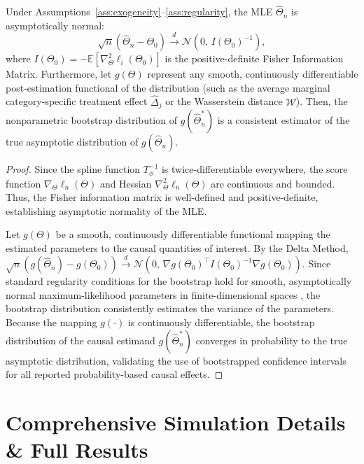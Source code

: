 \documentclass{article}
\numberwithin{figure}{section}
\numberwithin{table}{section}
\numberwithin{equation}{section}
\begin{document}
\begin{theorem}
Under Assumptions~\ref{ass:exogeneity}--\ref{ass:regularity}, the MLE $\widehat{\Theta}_n$ is asymptotically normal:
\begin{equation}
\sqrt{n}(\widehat{\Theta}_n - \Theta_0) \xrightarrow{d} \mathcal{N}(0, \, I(\Theta_0)^{-1}),
\end{equation}
where $I(\Theta_0) = -\mathbb{E}[\nabla^2_\Theta \ell_i(\Theta_0)]$ is the positive-definite Fisher Information Matrix. Furthermore, let $g(\Theta)$ represent any smooth, continuously differentiable post-estimation functional of the distribution (such as the average marginal category-specific treatment effect $\widehat{\Delta}_j$ or the Wasserstein distance $\mathcal{W}$). Then, the nonparametric bootstrap distribution of $g(\widehat{\Theta}_n^*)$ is a consistent estimator of the true asymptotic distribution of $g(\widehat{\Theta}_n)$.
\end{theorem}

\begin{proof}
Since the spline function $T_\phi^{-1}$ is twice-differentiable everywhere, the score function $\nabla_\Theta \ell_n(\Theta)$ and Hessian $\nabla^2_\Theta \ell_n(\Theta)$ are continuous and bounded. Thus, the Fisher information matrix is well-defined and positive-definite, establishing asymptotic normality of the MLE. 

Let $g(\Theta)$ be a smooth, continuously differentiable functional mapping the estimated parameters to the causal quantities of interest. By the Delta Method, $\sqrt{n}(g(\widehat{\Theta}_n) - g(\Theta_0)) \xrightarrow{d} \mathcal{N}(0, \, \nabla g(\Theta_0)^\top I(\Theta_0)^{-1} \nabla g(\Theta_0))$. Since standard regularity conditions for the bootstrap hold for smooth, asymptotically normal maximum-likelihood parameters in finite-dimensional spaces \citep{Bickel1981a}, the bootstrap distribution consistently estimates the variance of the parameters. Because the mapping $g(\cdot)$ is continuously differentiable, the bootstrap distribution of the causal estimand $g(\widehat{\Theta}_n^*)$ converges in probability to the true asymptotic distribution, validating the use of bootstrapped confidence intervals for all reported probability-based causal effects.
\end{proof}

\clearpage

\section{Comprehensive Simulation Details \& Full Results}
\label{app:simulation}
\end{document}
